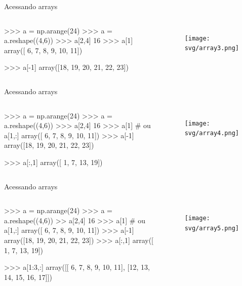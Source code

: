 \documentclass[12pt,t,graphics]{beamer}
\begin{document}
\begin{frame}[t,fragile]{Acessando arrays}
	\begin{columns}
		\begin{python}
>>> a = np.arange(24)
>>> a = a.reshape((4,6))
>>> a[2,4]
16
>>> a[1]
array([ 6,  7,  8,  9, 10, 11])
		
>>> a[-1]
array([18, 19, 20, 21, 22, 23])
		\end{python}
		\begin{figure}
			\centering
			\texttt{[image: svg/array3.png]}
		\end{figure}
	\end{columns}
\end{frame}

\begin{frame}[t,fragile]{Acessando arrays}
	\begin{columns}
		\column{.5\textwidth}
		\begin{python}
>>> a = np.arange(24)
>>> a = a.reshape((4,6))
>>> a[2,4]
16
>>> a[1]  # ou a[1,:]
array([ 6,  7,  8,  9, 10, 11])
>>> a[-1]
array([18, 19, 20, 21, 22, 23])
		
>>> a[:,1]
array([ 1,  7, 13, 19])
		\end{python}
		\column{.5\textwidth}
		\begin{figure}
			\centering
			\texttt{[image: svg/array4.png]}
		\end{figure}
	\end{columns}
\end{frame}

\begin{frame}[t,fragile]{Acessando arrays}
	\begin{columns}
		\begin{python}
>>> a = np.arange(24)
>>> a = a.reshape((4,6))
>> a[2,4]
16
>>> a[1]  # ou a[1,:]
array([ 6,  7,  8,  9, 10, 11])
>>> a[-1]
array([18, 19, 20, 21, 22, 23])
>>> a[:,1]
array([ 1,  7, 13, 19])
		
>>> a[1:3,:]
array([[ 6,  7,  8,  9, 10, 11],
[12, 13, 14, 15, 16, 17]])		
		\end{python}
		\begin{figure}
			\centering
			\texttt{[image: svg/array5.png]}
		\end{figure}
	\end{columns}
\end{frame}
\end{document}
